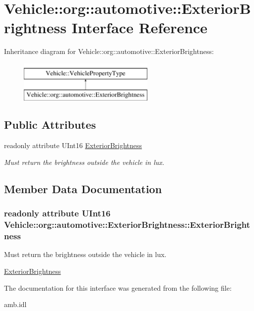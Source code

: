 \hypertarget{interfaceVehicle_1_1org_1_1automotive_1_1ExteriorBrightness}{\section{Vehicle\-:\-:org\-:\-:automotive\-:\-:Exterior\-Brightness Interface Reference}
\label{interfaceVehicle_1_1org_1_1automotive_1_1ExteriorBrightness}
}
Inheritance diagram for Vehicle\-:\-:org\-:\-:automotive\-:\-:Exterior\-Brightness\-:\begin{figure}[H]
\begin{center}
\leavevmode
\includegraphics[height=2.000000cm]{interfaceVehicle_1_1org_1_1automotive_1_1ExteriorBrightness}
\end{center}
\end{figure}
\subsection*{Public Attributes}
\begin{DoxyCompactItemize}
\item 
readonly attribute U\-Int16 \hyperlink{interfaceVehicle_1_1org_1_1automotive_1_1ExteriorBrightness_a0054f575045808d25d4a01a5040aad41}{Exterior\-Brightness}
\begin{DoxyCompactList}\small\item\em Must return the brightness outside the vehicle in lux. \end{DoxyCompactList}\end{DoxyCompactItemize}


\subsection{Member Data Documentation}
\hypertarget{interfaceVehicle_1_1org_1_1automotive_1_1ExteriorBrightness_a0054f575045808d25d4a01a5040aad41}{
\subsubsection[{Exterior\-Brightness}]{\setlength{\rightskip}{0pt plus 5cm}readonly attribute U\-Int16 Vehicle\-::org\-::automotive\-::\-Exterior\-Brightness\-::\-Exterior\-Brightness}}\label{interfaceVehicle_1_1org_1_1automotive_1_1ExteriorBrightness_a0054f575045808d25d4a01a5040aad41}


Must return the brightness outside the vehicle in lux. 

\hyperlink{interfaceVehicle_1_1org_1_1automotive_1_1ExteriorBrightness}{Exterior\-Brightness} 

The documentation for this interface was generated from the following file\-:\begin{DoxyCompactItemize}
\item 
amb.\-idl\end{DoxyCompactItemize}
